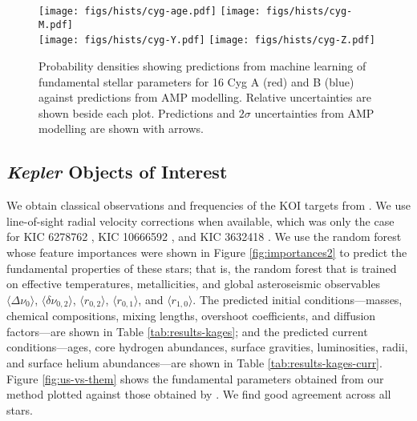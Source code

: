 \documentclass[twocolumn,twocolappendix]{aastex6}
\begin{document}
\begin{figure*}
    \centering
    \texttt{[image: figs/hists/cyg-age.pdf]}\hfill
    \texttt{[image: figs/hists/cyg-M.pdf]}\\
    \texttt{[image: figs/hists/cyg-Y.pdf]}\hfill
    \texttt{[image: figs/hists/cyg-Z.pdf]}
    \caption{Probability densities showing predictions from machine learning of fundamental stellar parameters for 16 Cyg A (red) and B (blue) against predictions from AMP modelling. Relative uncertainties are shown beside each plot. Predictions and $2\sigma$ uncertainties from AMP modelling are shown with arrows. \vspace*{5mm}
    \label{fig:16Cyg-hist}}
\end{figure*}


\subsection{\emph{Kepler} Objects of Interest}
We obtain classical observations and frequencies of the KOI targets from \citet{2016MNRAS.456.2183D}. We use line-of-sight radial velocity corrections when available, which was only the case for KIC 6278762 \citep{2002AJ....124.1144L}, KIC 10666592 \citep{2013A&A...554A..84M}, and KIC 3632418 \citep{2006AstL...32..759G}. We use the random forest whose feature importances were shown in Figure \ref{fig:importances2} to predict the fundamental properties of these stars; that is, the random forest that is trained on effective temperatures, metallicities, and global asteroseismic observables $\langle \Delta\nu_0 \rangle$, $\langle \delta\nu_{0,2} \rangle$, $\langle r_{0,2} \rangle$, $\langle r_{0,1} \rangle$, and $\langle r_{1,0} \rangle$. The predicted initial conditions---masses, chemical compositions, mixing lengths, overshoot coefficients, and diffusion factors---are shown in Table \ref{tab:results-kages}; and the predicted current conditions---ages, core hydrogen abundances, surface gravities, luminosities, radii, and surface helium abundances---are shown in Table \ref{tab:results-kages-curr}. Figure \ref{fig:us-vs-them} shows the fundamental parameters obtained from our method plotted against those obtained by \citet[hereinafter KAGES]{2015MNRAS.452.2127S}. We find good agreement across all stars. 
\end{document}
